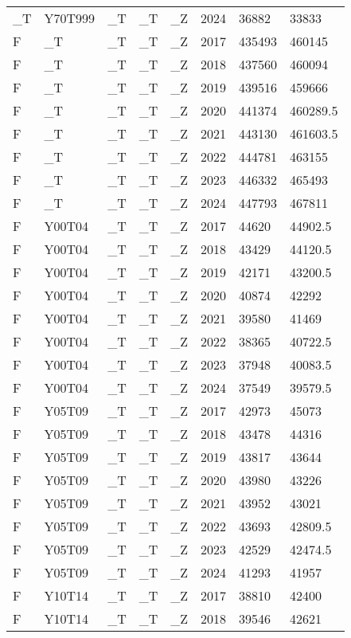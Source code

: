 \begin{longtable}[t]{llllllll}
\_T & Y70T999 & \_T & \_T & \_Z & 2024 & 36882 & 33833\\
\addlinespace
F & \_T & \_T & \_T & \_Z & 2017 & 435493 & 460145\\
F & \_T & \_T & \_T & \_Z & 2018 & 437560 & 460094\\
F & \_T & \_T & \_T & \_Z & 2019 & 439516 & 459666\\
F & \_T & \_T & \_T & \_Z & 2020 & 441374 & 460289.5\\
F & \_T & \_T & \_T & \_Z & 2021 & 443130 & 461603.5\\
\addlinespace
F & \_T & \_T & \_T & \_Z & 2022 & 444781 & 463155\\
F & \_T & \_T & \_T & \_Z & 2023 & 446332 & 465493\\
F & \_T & \_T & \_T & \_Z & 2024 & 447793 & 467811\\
F & Y00T04 & \_T & \_T & \_Z & 2017 & 44620 & 44902.5\\
F & Y00T04 & \_T & \_T & \_Z & 2018 & 43429 & 44120.5\\
\addlinespace
F & Y00T04 & \_T & \_T & \_Z & 2019 & 42171 & 43200.5\\
F & Y00T04 & \_T & \_T & \_Z & 2020 & 40874 & 42292\\
F & Y00T04 & \_T & \_T & \_Z & 2021 & 39580 & 41469\\
F & Y00T04 & \_T & \_T & \_Z & 2022 & 38365 & 40722.5\\
F & Y00T04 & \_T & \_T & \_Z & 2023 & 37948 & 40083.5\\
\addlinespace
F & Y00T04 & \_T & \_T & \_Z & 2024 & 37549 & 39579.5\\
F & Y05T09 & \_T & \_T & \_Z & 2017 & 42973 & 45073\\
F & Y05T09 & \_T & \_T & \_Z & 2018 & 43478 & 44316\\
F & Y05T09 & \_T & \_T & \_Z & 2019 & 43817 & 43644\\
F & Y05T09 & \_T & \_T & \_Z & 2020 & 43980 & 43226\\
\addlinespace
F & Y05T09 & \_T & \_T & \_Z & 2021 & 43952 & 43021\\
F & Y05T09 & \_T & \_T & \_Z & 2022 & 43693 & 42809.5\\
F & Y05T09 & \_T & \_T & \_Z & 2023 & 42529 & 42474.5\\
F & Y05T09 & \_T & \_T & \_Z & 2024 & 41293 & 41957\\
F & Y10T14 & \_T & \_T & \_Z & 2017 & 38810 & 42400\\
\addlinespace
F & Y10T14 & \_T & \_T & \_Z & 2018 & 39546 & 42621\\

\end{longtable}
